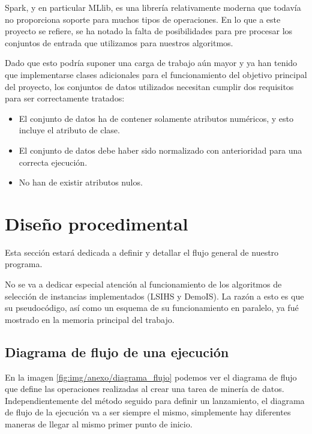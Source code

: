 Spark, y en particular MLlib, es una librería relativamente moderna que todavía no proporciona soporte para muchos tipos de operaciones. En lo que a este proyecto se refiere, se ha notado la falta de posibilidades para pre procesar los conjuntos de entrada que utilizamos para nuestros algoritmos.

Dado que esto podría suponer una carga de trabajo aún mayor y ya han tenido que implementarse clases adicionales para el funcionamiento del objetivo principal del proyecto, los conjuntos de datos utilizados necesitan cumplir dos requisitos para ser correctamente tratados:

\begin{itemize}
\item El conjunto de datos ha de contener solamente atributos numéricos, y esto incluye el atributo de clase.
\item El conjunto de datos debe haber sido normalizado con anterioridad para una correcta ejecución.
\item No han de existir atributos nulos.
\end{itemize}

\section{Diseño procedimental}




Esta sección estará dedicada a definir y detallar el flujo general de nuestro programa.

No se va a dedicar especial atención al funcionamiento de los algoritmos de selección de instancias implementados (LSIHS y DemoIS). La razón a esto es que su pseudocódigo, así como un esquema de su funcionamiento en paralelo, ya fué mostrado en la memoria principal del trabajo.


\subsection{Diagrama de flujo de una ejecución}

En la imagen \ref{fig:img/anexo/diagrama_flujo} podemos ver el diagrama de flujo que define las operaciones realizadas al crear una tarea de minería de datos. Independientemente del método seguido para definir un lanzamiento, el diagrama de flujo de la ejecución va a ser siempre el mismo, simplemente hay diferentes maneras de llegar al mismo primer punto de inicio.

